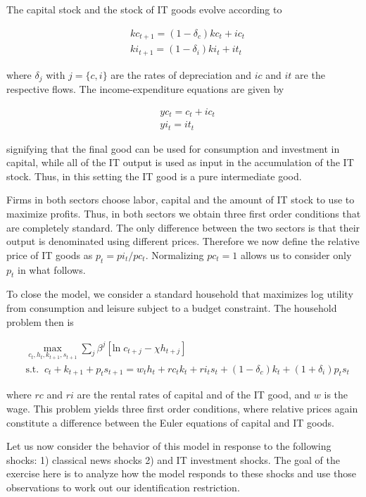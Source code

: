 \documentclass[11pt]{article}
\renewcommand{\[}{\begin{equation}}
\renewcommand{\]}{\end{equation}}
\begin{document}
The capital stock and the stock of IT goods evolve according to

\begin{align}
& kc_{t+1}  = (1-\delta_c )kc_t + ic_t \\
& ki_{t+1}  = (1-\delta_i)ki_t + it_t 
\end{align}

where $\delta_j$ with $j = \{c,i\}$ are the rates of depreciation and $ic$ and $it$ are the respective flows. The income-expenditure equations are given by

\begin{align}
& yc_t = c_t + ic_t \\
& yi_t = it_t 
\end{align}

signifying that the final good can be used for consumption and investment in capital, while all of the IT output is used as input in the accumulation of the IT stock. Thus, in this setting the IT good is a pure intermediate good.

Firms in both sectors choose labor, capital and the amount of IT stock to use to maximize profits. Thus, in both sectors we obtain three first order conditions that are completely standard. The only difference between the two sectors is that their output is denominated using different prices. Therefore we now define the relative price of IT goods as $p_t = pi_t / pc_t$. Normalizing $pc_t = 1$ allows us to consider only $p_t$ in what follows. 

To close the model, we consider a standard household that maximizes log utility from consumption and leisure subject to a budget constraint. The household problem then is

\begin{align}
& \max_{c_t, h_t, k_{t+1}, s_{t+1}} \sum_j \beta^j \left[ \text{ln} \;  c_{t+j} - \chi h_{t+j} \right] \\
& \text{s.t.} \; \; c_t + k_{t+1} + p_t s_{t+1} = w_t h_t + rc_t k_t + ri_t s_t + (1-\delta_c)k_t + (1+ \delta_i)p_t s_t
\end{align}

where $rc$ and $ri$ are the rental rates of capital and of the IT good, and $w$ is the wage. This problem yields three first order conditions, where relative prices again constitute a difference between the Euler equations of capital and IT goods. 

Let us now consider the behavior of this model in response to the following shocks: 1) classical news shocks 2) and IT investment shocks. The goal of the exercise here is to analyze how the model responds to these shocks and use those observations to work out our identification restriction. 
\end{document}
